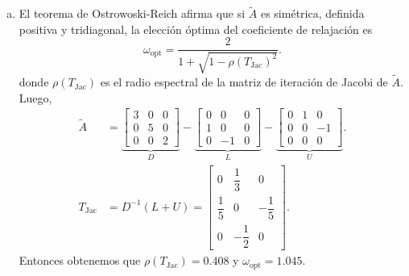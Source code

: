 \begin{frame}
	\begin{solution}
		\begin{enumerate}[b)]
			\item

			      El teorema de \alert{Ostrowoski-Reich} afirma que si
			      $\widetilde{A}$ es simétrica, definida positiva y
			      tridiagonal, la elección óptima del
			      coeficiente de relajación es
			      \begin{equation*}
				      \omega_{\text{opt}}=
				      \dfrac{2}{
				      1+
				      \sqrt{1-{\rho\left(T_{\text{Jac}}\right)}^{2}}
				      }.
			      \end{equation*}
			      donde \begin{math}
				      \rho\left(T_{\text{Jac}}\right)
			      \end{math}
			      es el radio espectral de la matriz de iteración de
			      Jacobi de $\widetilde{A}$.
			      Luego,
			      \begin{align*}
				      \widetilde{A}  & =
				      \underbrace{ \begin{bmatrix}
						                   3 & 0 & 0 \\
						                   0 & 5 & 0 \\
						                   0 & 0 & 2
					                   \end{bmatrix}}_{\displaystyle D}
				      -
				      \underbrace{\begin{bmatrix}
						                  0 & 0  & 0 \\
						                  1 & 0  & 0 \\
						                  0 & -1 & 0
					                  \end{bmatrix}}_{\displaystyle L}
				      -
				      \underbrace{\begin{bmatrix}
						                  0 & 1 & 0  \\
						                  0 & 0 & -1 \\
						                  0 & 0 & 0
					                  \end{bmatrix}}_{\displaystyle U}. \\
				      T_{\text{Jac}} & =D^{-1}\left(L+U\right)=
				      \begin{bmatrix}
					      0            & \dfrac{1}{3}  & 0             \\
					      \dfrac{1}{5} & 0             & -\dfrac{1}{5} \\
					      0            & -\dfrac{1}{2} & 0
				      \end{bmatrix}.
			      \end{align*}
			      Entonces obtenemos que
			      \begin{math}
				      \rho\left(T_{\text{Jac}}\right)=
				      0.408
			      \end{math}
			      y
			      \begin{math}
				      \omega_{\text{opt}}=
				      1.045
			      \end{math}.
		\end{enumerate}
	\end{solution}
\end{frame}

